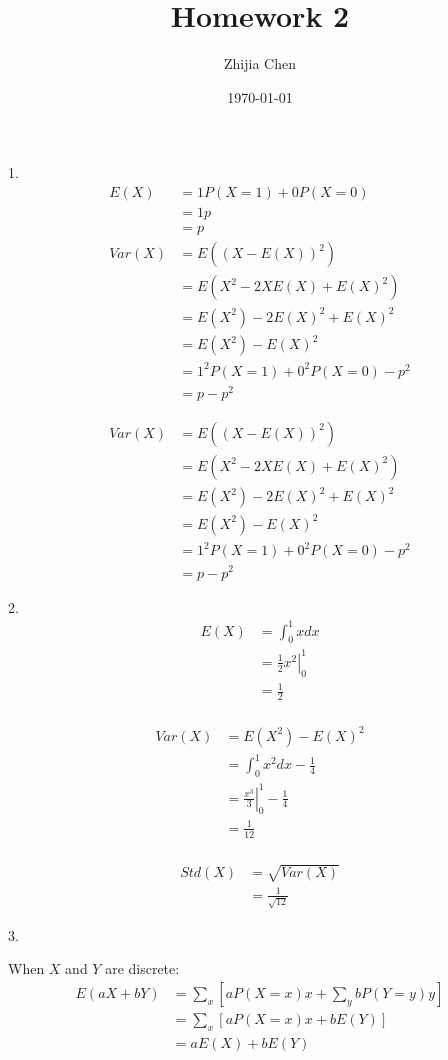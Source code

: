 \documentclass{article}
\title{Homework 2 }
\author{Zhijia Chen}
\date{\today}
\begin{document}
\begin{titlepage}
    \maketitle
\end{titlepage}

1.
\begin{align*}
    E(X)&=1P(X=1)+0P(X=0)\\
    &=1p\\
    &=p\\
    Var(X)&=E((X-E(X))^2)\\
    &=E(X^2-2XE(X)+E(X)^2)\\
    &=E(X^2)-2E(X)^2+E(X)^2\\
    &=E(X^2)-E(X)^2\\
    &=1^2P(X=1)+0^2P(X=0)-p^2\\
    &=p-p^2
\end{align*}

\begin{align*}
    Var(X)&=E((X-E(X))^2)\\
    &=E(X^2-2XE(X)+E(X)^2)\\
    &=E(X^2)-2E(X)^2+E(X)^2\\
    &=E(X^2)-E(X)^2\\
    &=1^2P(X=1)+0^2P(X=0)-p^2\\
    &=p-p^2
\end{align*}

2.
\begin{align*}
    E(X)&=\int_0^1xdx\\
    &=\left.\frac{1}{2}x^2\right|_0^1\\
    &=\frac{1}{2}\\
\end{align*}

\begin{align*}
    Var(X)&=E(X^2)-E(X)^2\\
    &=\int_0^1x^2dx-\frac{1}{4}\\
    &=\left.\frac{x^3}{3}\right|_0^1-\frac{1}{4}\\
    &=\frac{1}{12}\\
\end{align*}

\begin{align*}
    Std(X)&=\sqrt{Var(X)}\\
    &=\frac{1}{\sqrt{12}}
\end{align*}

3.

When $X$ and $Y$ are discrete: 
\begin{align*}
    E(aX+bY)&=\sum_x\left[aP(X=x)x+\sum_ybP(Y=y)y\right]\\
    &=\sum_x\left[aP(X=x)x+bE(Y)\right]\\
    &=aE(X)+bE(Y)
\end{align*}
\end{document}
